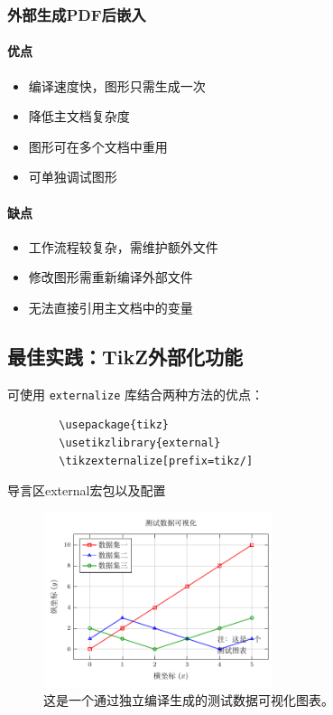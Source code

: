\subsubsection{外部生成PDF后嵌入}

\paragraph{优点}

\begin{itemize}
    \item 编译速度快，图形只需生成一次
    \item 降低主文档复杂度
    \item 图形可在多个文档中重用
    \item 可单独调试图形
\end{itemize}

\paragraph{缺点}

\begin{itemize}
    \item 工作流程较复杂，需维护额外文件
    \item 修改图形需重新编译外部文件
    \item 无法直接引用主文档中的变量
\end{itemize}

\subsection{最佳实践：TikZ外部化功能}

可使用 \texttt{externalize} 库结合两种方法的优点：

\begin{listing}[H]
    \begin{verbatim}
        \usepackage{tikz}
        \usetikzlibrary{external}
        \tikzexternalize[prefix=tikz/]
    \end{verbatim}
    \caption{导言区external宏包以及配置}
\end{listing}

\begin{figure}[htbp]
    \centering
    \includegraphics[width=0.6\textwidth]{plots/plot_test.pdf}
    \caption{这是一个通过独立编译生成的测试数据可视化图表。}
\end{figure}